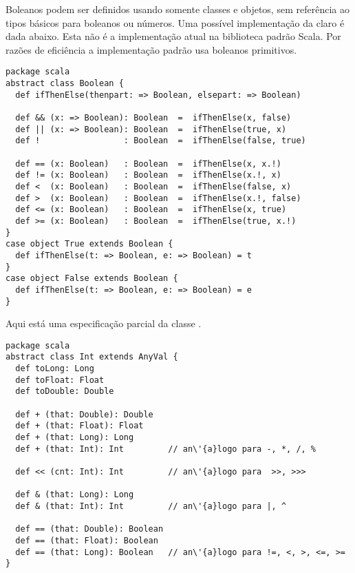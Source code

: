 Boleanos podem ser definidos usando somente classes e objetos, sem
refer\^{e}ncia ao tipos b\'{a}sicos para boleanos ou n\'{u}meros. Uma poss\'{i}vel 
implementa\c{c}\~{a}o da claro  \'{e} dada abaixo. Esta n\~{a}o \'{e} 
a implementa\c{c}\~{a}o atual na biblioteca padr\~{a}o Scala. Por raz\~{o}es de 
efici\^{e}ncia a implementa\c{c}\~{a}o padr\~{a}o usa boleanos primitivos.
\begin{lstlisting}
package scala
abstract class Boolean {
  def ifThenElse(thenpart: => Boolean, elsepart: => Boolean)

  def && (x: => Boolean): Boolean  =  ifThenElse(x, false)
  def || (x: => Boolean): Boolean  =  ifThenElse(true, x)
  def !                 : Boolean  =  ifThenElse(false, true)

  def == (x: Boolean)   : Boolean  =  ifThenElse(x, x.!)
  def != (x: Boolean)   : Boolean  =  ifThenElse(x.!, x)
  def <  (x: Boolean)   : Boolean  =  ifThenElse(false, x)
  def >  (x: Boolean)   : Boolean  =  ifThenElse(x.!, false)
  def <= (x: Boolean)   : Boolean  =  ifThenElse(x, true)
  def >= (x: Boolean)   : Boolean  =  ifThenElse(true, x.!)
}
case object True extends Boolean {
  def ifThenElse(t: => Boolean, e: => Boolean) = t
}
case object False extends Boolean {
  def ifThenElse(t: => Boolean, e: => Boolean) = e
}
\end{lstlisting}

Aqui est\'{a} uma especifica\c{c}\~{a}o parcial da classe .
\begin{lstlisting}
package scala
abstract class Int extends AnyVal {
  def toLong: Long
  def toFloat: Float
  def toDouble: Double

  def + (that: Double): Double
  def + (that: Float): Float
  def + (that: Long): Long
  def + (that: Int): Int         // an\'{a}logo para -, *, /, %

  def << (cnt: Int): Int         // an\'{a}logo para  >>, >>>

  def & (that: Long): Long
  def & (that: Int): Int         // an\'{a}logo para |, ^

  def == (that: Double): Boolean
  def == (that: Float): Boolean
  def == (that: Long): Boolean   // an\'{a}logo para !=, <, >, <=, >=
}
\end{lstlisting}

